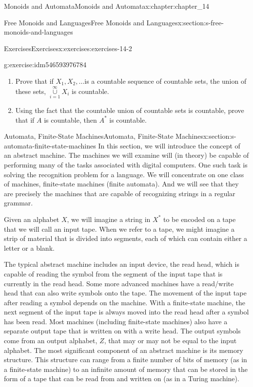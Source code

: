 \documentclass[oneside,10pt,]{book}
\numberwithin{equation}{section}
\begin{document}
\begin{chapterptx}{Monoids and Automata}{}{Monoids and Automata}{}{}{x:chapter:chapter_14}
\begin{sectionptx}{Free Monoids and Languages}{}{Free Monoids and Languages}{}{}{x:section:s-free-monoids-and-languages}
\begin{exercises-subsection}{Exercises}{}{Exercises}{}{}{x:exercises:exercises-14-2}
\begin{divisionexercise}{9}{}{}{g:exercise:idm546593976784}
%
\begin{enumerate}[label=(\alph*)]
\item{}Prove that if \(X_1, X_2, \ldots\)is a countable sequence of countable sets, the union of these sets, \(\underset{i=1}{\overset{\infty }{\cup}}X_i\) is countable.%
\item{}Using the fact that the countable union of countable sets is countable, prove that if \(A\) is countable, then \(A^*\) is countable.%
\end{enumerate}
%
\end{divisionexercise}%
\end{exercises-subsection}
\end{sectionptx}
%
%
\typeout{************************************************}
\typeout{************************************************}
%
\begin{sectionptx}{Automata, Finite-State Machines}{}{Automata, Finite-State Machines}{}{}{x:section:s-automata-finite-state-machines}
%
%
In this section, we will introduce the concept of an abstract machine. The machines we will examine will (in theory) be capable of performing many of the tasks associated with digital computers. One such task is solving the recognition problem for a language. We will concentrate on one class of machines, finite-state machines (finite automata). And we will see that they are precisely the machines that are capable of recognizing strings in a regular grammar.%
\par
Given an alphabet \(X\), we will imagine a string in \(X^*\) to be encoded on a tape that we will call an input tape. When we refer to a tape, we might imagine a strip of material that is divided into segments, each of which can contain either a letter or a blank.%
\par
The typical abstract machine includes an input device, the read head, which is capable of reading the symbol from the segment of the input tape that is currently in the read head. Some more advanced machines have a read\slash{}write head that can also write symbols onto the tape. The movement of the input tape after reading a symbol depends on the machine. With a finite-state machine, the next segment of the input tape is always moved into the read head after a symbol has been read. Most machines (including finite-state machines) also have a separate output tape that is written on with a write head. The output symbols come from an output alphabet, \(Z\), that may or may not be equal to the input alphabet. The most significant component of an abstract machine is its memory structure. This structure can range from a finite number of bits of memory (as in a finite-state machine) to an infinite amount of memory that can be stored in the form of a tape that can be read from and written on (as in a Turing machine).%

\end{sectionptx}
\end{chapterptx}
\end{document}

